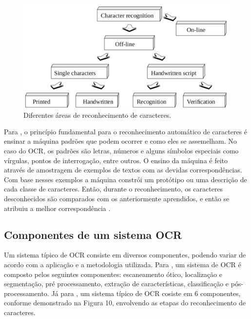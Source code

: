  \begin{figure}[h]
	\centering
	\includegraphics[width=1.0\textwidth]{Imagens/areasocr} 
	\caption[Diferentes áreas de reconhecimento de caracteres.]{Diferentes áreas de reconhecimento de caracteres.}
	\label{fig:tux_laplace}
\end{figure}

Para , o princípio fundamental para o reconhecimento
automático de caracteres é ensinar a máquina padrões que podem ocorrer e como eles se assemelham. No caso do OCR, os padrões são letras, números e alguns símbolos especiais como vírgulas, pontos de interrogação, entre outros. O ensino da máquina é feito através de amostragem de exemplos de textos com as devidas correspondências.
Com base nesses exemplos a máquina constrói um protótipo ou uma
descrição de cada classe de caracteres. Então, durante o reconhecimento, os caracteres desconhecidos são comparados com os anteriormente aprendidos, e então se atribuiu a melhor correspondência \cite{Eikvil1993}.

\subsection{Componentes de um sistema OCR}
Um sistema típico de OCR consiste em diversos componentes, podendo variar de
acordo com a aplicação e a metodologia utilizada. 
Para , um sistema de OCR é composto pelos seguintes componentes: escaneamento ótico, localização e segmentação, pré processamento, extração de características, classificação e pós-processamento. Já para , um sistema típico de OCR cosiste em 6 componentes, conforme demonstrado na Figura 10, envolvendo as etapas do reconhecimento de caracteres.



